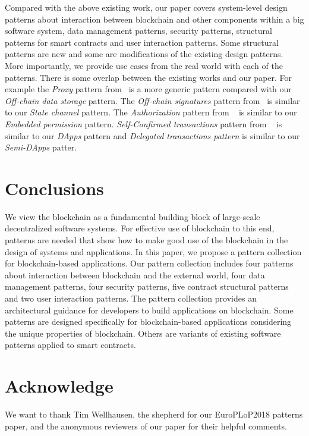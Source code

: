 Compared with the above existing work, our paper covers system-level design patterns about interaction between blockchain and other components within a big software system, data management patterns, security patterns, structural patterns for smart contracts and user interaction patterns. Some structural patterns are new and some are modifications of the existing design patterns. More importantly, we provide use cases from the real world with each of the patterns. There is some overlap between the existing works and our paper. For example the \emph{Proxy} pattern from~\cite{factorypattern} is a more generic pattern compared with our \emph{Off-chain data storage} pattern. The \emph{Off-chain signatures} pattern from~\cite{Eberhardt2017} is similar to our \emph{State channel} pattern. The \emph{Authorization} pattern from ~\cite{designPatterns1} is similar to our \emph{Embedded permission} pattern. \emph{Self-Confirmed transactions} pattern from ~\cite{patternICSA2018} is similar to our \emph{DApps} pattern and \emph{Delegated transactions pattern} is similar to our \emph{Semi-DApps} patter. 


\section{Conclusions}
\label{sec:conclusions}

We view the blockchain as a fundamental building block of large-scale decentralized software systems. For effective use of blockchain to this end, patterns are needed that show how to make good use of the blockchain in the design of systems and applications. In this paper, we propose a pattern collection for blockchain-based applications. Our pattern collection includes four patterns about interaction between blockchain and the external world, four data management patterns, four security patterns, five contract structural patterns and two user interaction patterns. The pattern collection provides an architectural guidance for developers to build applications on blockchain. Some patterns are designed specifically for blockchain-based applications considering the unique properties of blockchain. Others are variants of existing software patterns applied to smart contracts. %


\section*{Acknowledge}

We want to thank Tim Wellhausen, the shepherd for our EuroPLoP2018 patterns paper, and the anonymous reviewers of our paper for their helpful comments.



%

